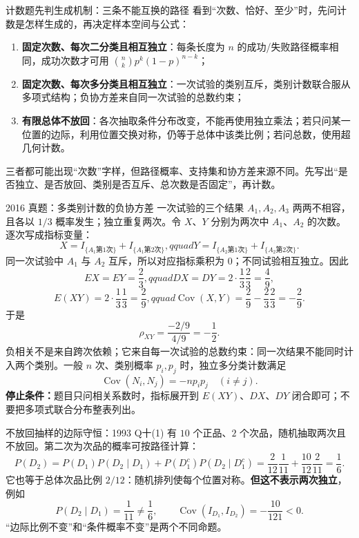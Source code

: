 \documentclass[11pt,a4paper]{ctexart}
\newcommand{\kw}[1]{\textbf{\color{deep}#1}}
\begin{document}
\begin{methodbox}{计数题先判生成机制：三条不能互换的路径}
看到“次数、恰好、至少”时，先问计数是怎样生成的，再决定样本空间与公式：
\begin{enumerate}
  \item \kw{固定次数、每次二分类且相互独立}：每条长度为 $n$ 的成功/失败路径概率相同，成功次数才可用
  $\binom nkp^k(1-p)^{n-k}$；
  \item \kw{固定次数、每次多分类且相互独立}：一次试验的类别互斥，类别计数联合服从多项式结构；负协方差来自同一次试验的总数约束；
  \item \kw{有限总体不放回}：各次抽取条件分布改变，不能再使用独立乘法；若只问某一位置的边际，利用位置交换对称，仍等于总体中该类比例；若问总数，使用超几何计数。
\end{enumerate}
三者都可能出现“次数”字样，但路径概率、支持集和协方差来源不同。先写出“是否独立、是否放回、类别是否互斥、总次数是否固定”，再计数。
\end{methodbox}

\begin{examplebox}{2016 真题：多类别计数的负协方差}
一次试验的三个结果 $A_1,A_2,A_3$ 两两不相容，且各以 $1/3$ 概率发生；独立重复两次。令 $X$、$Y$ 分别为两次中 $A_1$、$A_2$ 的次数。逐次写成指标变量：
\[
X=I_{\{A_1\text{第1次}\}}+I_{\{A_1\text{第2次}\}},qquad
Y=I_{\{A_2\text{第1次}\}}+I_{\{A_2\text{第2次}\}}.
\]
同一次试验中 $A_1$ 与 $A_2$ 互斥，所以对应指标乘积为 $0$；不同试验相互独立。因此
\[
EX=EY=\frac23,qquad DX=DY=2\cdot\frac13\frac23=\frac49,
\]
\[
E(XY)=2\cdot\frac13\frac13=\frac29,qquad
\operatorname{Cov}(X,Y)=\frac29-\frac23\frac23=-\frac29.
\]
于是
\[
\rho_{XY}=\frac{-2/9}{4/9}=-\frac12.
\]
负相关不是来自跨次依赖；它来自每一次试验的总数约束：同一次结果不能同时计入两个类别。一般 $n$ 次、类别概率 $p_i,p_j$ 时，独立多分类计数满足
\[
\operatorname{Cov}(N_i,N_j)=-np_ip_j\quad(i\ne j).
\]
\textbf{停止条件：}题目只问相关系数时，指标展开到 $E(XY)$、$DX$、$DY$ 闭合即可；不要把多项式联合分布整表列出。
\end{examplebox}

\begin{examplebox}{不放回抽样的边际守恒：1993 Q十(1)}
有 $10$ 个正品、$2$ 个次品，随机抽取两次且不放回。第二次为次品的概率可按路径计算：
\[
P(D_2)=P(D_1)P(D_2\mid D_1)+P(D_1^c)P(D_2\mid D_1^c)
=\frac{2}{12}\frac1{11}+\frac{10}{12}\frac2{11}=\frac16.
\]
它也等于总体次品比例 $2/12$：随机排列使每个位置对称。\textbf{但这不表示两次独立}，例如
\[
P(D_2\mid D_1)=\frac1{11}\ne\frac16,
\qquad \operatorname{Cov}(I_{D_1},I_{D_2})=-\frac{10}{121}<0.
\]
“边际比例不变”和“条件概率不变”是两个不同命题。
\end{examplebox}
\end{document}
